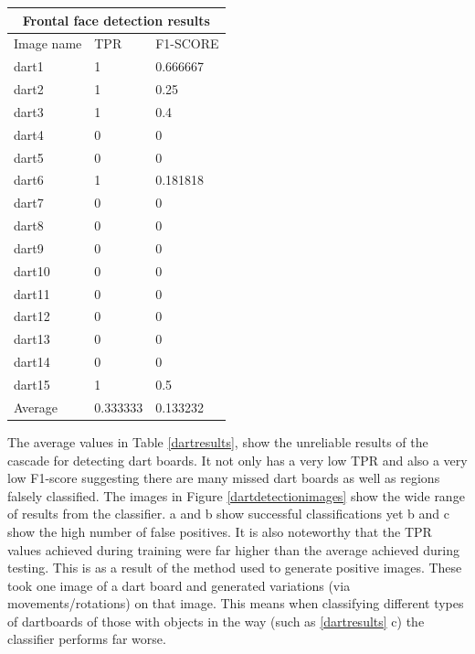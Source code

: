 \documentclass{article}
\begin{document}
\begin{tabular}{ |p{2cm}||p{2cm}|p{2cm}| }
\label{dartresults}
 \hline
 \multicolumn{3}{|c|}{Frontal face detection results} \\
 \hline
 Image name & TPR & F1-SCORE \\
 \hline
 dart1  & 1  & 0.666667   \\
 dart2  & 1  & 0.25       \\
 dart3  & 1  & 0.4        \\
 dart4  & 0  & 0          \\
 dart5  & 0  & 0          \\
 dart6  & 1  & 0.181818   \\
 dart7  & 0  & 0          \\
 dart8  & 0  & 0          \\
 dart9  & 0  & 0          \\
 dart10 & 0  & 0          \\
 dart11 & 0  & 0          \\
 dart12 & 0  & 0          \\
 dart13 & 0  & 0          \\
 dart14 & 0  & 0          \\
 dart15 & 1  & 0.5        \\
 \hline
 Average& 0.333333  & 0.133232    \\ 
 \hline
\end{tabular}

The average values in Table \ref{dartresults}, show the unreliable results of
the cascade for detecting dart boards.  It not only has a very low TPR and also
a very low F1-score suggesting there are many missed dart boards as well as
regions falsely classified. The images in Figure \ref{dartdetectionimages} show
the wide range of results from the classifier. a and b show successful
classifications yet b and c show the high number of false positives. It is also
noteworthy that the TPR values achieved during training were far higher than
the average achieved during testing. This is as a result of the method used to
generate positive images. These took one image of a dart board and generated
variations (via movements/rotations) on that image. This means when classifying
different types of dartboards of those with objects in the way (such as
\ref{dartresults} c) the classifier performs far worse.
\end{document}
